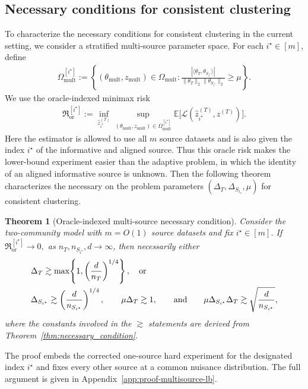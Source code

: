 \documentclass[10pt]{article}
\newtheorem{theorem}{Theorem}
\newcommand{\Ebb}{\mathbb E}
\newcommand{\ip}[2]{\langle #1,#2\rangle}
\newcommand{\norm}[1]{\lVert #1\rVert}
\newcommand{\wh}{\widehat}
\newcommand{\calL}{\mathcal L}
\newcommand{\trg}{T}
\newcommand{\thetaT}{\theta_{\trg}}
\newcommand{\nT}{n_{\trg}}
\newcommand{\ztar}{z^{(\trg)}}
\newcommand{\hatztar}{\wh{z}^{(\trg)}}
\newcommand{\DeltaT}{\Delta_{\trg}}
\newcommand{\src}{S}
\newcommand{\nSm}[1]{n_{\src_{#1}}}
\newcommand{\thetamS}[1]{\theta_{\src_{#1}}}
\newcommand{\DeltaSm}[1]{\Delta_{\src_{#1}}}
\begin{document}
\subsection{Necessary conditions for consistent clustering}
To characterize the necessary conditions for consistent clustering in the current setting, we 
consider a stratified multi-source parameter space.
For each $i^\star\in[m]$, define
\begin{align}
\label{eq:param_class_mult_i}
    \Omega_{\mathrm{mult}}^{[i^\star]}
    :=
    \left\{
        (\theta_{\mathrm{mult}},z_{\mathrm{mult}})\in\Omega_{\mathrm{mult}}:
        \frac{|\ip{\thetaT}{\thetamS{i^\star}}|}
        {\norm{\thetaT}_2\norm{\thetamS{i^\star}}_2}\ge\mu
    \right\}.
\end{align}
We use the oracle-indexed minimax risk
\begin{align}
\label{eq:minimax_risk_mult_oracle_index}
    \mathfrak R_{\mathrm{or}}^{[i^\star]}
    :=
    \inf_{\hatztar_{i^\star}}
    \sup_{(\theta_{\mathrm{mult}},z_{\mathrm{mult}})
        \in\Omega_{\mathrm{mult}}^{[i^\star]}}
    \Ebb\bigl[\calL(\hatztar_{i^\star},\ztar)\bigr].
\end{align}
Here the estimator is allowed to use all $m$ source datasets and is also
given the index $i^\star$ of the informative and aligned source.  Thus this oracle risk makes the lower-bound
experiment easier than the adaptive problem, in which the identity of an
aligned informative source is unknown. Then the following theorem characterizes the necessary on the problem parameters $(\DeltaT,\DeltaSm{i_\star},\mu)$ for consistent clustering.

\begin{theorem}[Oracle-indexed multi-source necessary condition]
\label{thm:two_clust_multi_source_lb}
Consider the two-community model with $m=O(1)$ source datasets and fix
$i^\star\in[m]$. If $\mathfrak R_{\mathrm{or}}^{[i^\star]}\to0,$ as
$\nT,\nSm{i^\star},d\to\infty$,
then necessarily either
\begin{align}
\label{eq:multi_source_lb_condition}
&\DeltaT\gtrsim\max\!\left\{1,\left(\frac{d}{\nT}\right)^{1/4}\right\}, \quad \text{or}\\
\notag
&\DeltaSm{i^\star}\gtrsim
\left(\frac{d}{\nSm{i^\star}}\right)^{1/4},\qquad
\mu\DeltaT\gtrsim 1,\qquad\text{and}\qquad
\mu\DeltaSm{i^\star}\DeltaT
\gtrsim \sqrt{\frac{d}{\nSm{i^\star}}},
\end{align}
where the constants involved in the $\gtrsim$ statements are derived from Theorem~\ref{thm:necessary_condition}.
\end{theorem}
The proof embeds the corrected one-source hard experiment for the designated
index $i^\star$ and fixes every other source at a common nuisance distribution.
The full argument is given in Appendix~\ref{app:proof-multisource-lb}.
\end{document}
